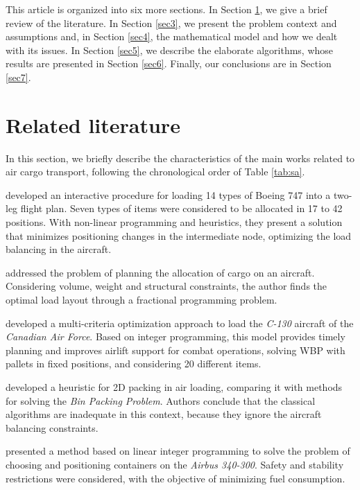\documentclass[preprint,authoryear]{elsarticle}
\begin{document}
This article is organized into six more sections. In Section \ref{sec2}, we give a brief review of the literature. In Section \ref{sec3}, we present the problem context and assumptions and, in Section \ref{sec4}, the mathematical model and how we dealt with its issues. In Section \ref{sec5}, we describe the elaborate algorithms, whose results are presented in Section \ref{sec6}. Finally, our conclusions are in Section \ref{sec7}.


\section{Related literature}
\label{sec2}

In this section, we briefly describe the characteristics of the main works related to air cargo transport, following the chronological order of Table \ref{tab:sa}.

\cite{LarsenMikkelsen1979} developed an interactive procedure for loading 14 types of Boeing 747 into a two-leg flight plan. Seven types of items were considered to be allocated in 17 to 42 positions. With non-linear programming and heuristics, they present a solution that minimizes positioning changes in the intermediate node, optimizing the load balancing in the aircraft.

\cite{Brosh1981} addressed the problem of planning the allocation of cargo on an aircraft. Considering volume, weight and structural constraints, the author finds the optimal load layout through a fractional programming problem.

\cite{Kevin1992} developed a multi-criteria optimization approach to load the {\it C-130} aircraft of the {\it Canadian Air Force}. Based on integer programming, this model provides timely planning and improves airlift support for combat operations, solving WBP with pallets in fixed positions, and considering 20 different items.

\cite{Heidelberg1998} developed a heuristic for 2D packing in air loading, comparing it with methods for solving the {\it Bin Packing Problem}. Authors conclude that the classical algorithms are inadequate in this context, because they ignore the aircraft balancing constraints.

\cite{MongeauBes2003} presented a method based on linear integer programming to solve the problem of choosing and positioning containers on the {\it Airbus 340-300}. Safety and stability restrictions were considered, with the objective of minimizing fuel consumption.
\end{document}

